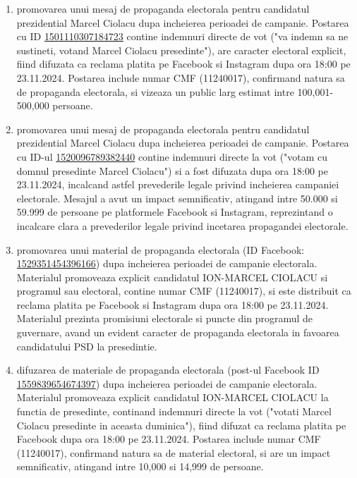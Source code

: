 \documentclass[a4paper,12pt]{article}
\begin{document}
\begin{enumerate}[leftmargin=*, label=\arabic*.)]
    \item promovarea unui mesaj de propaganda electorala pentru candidatul prezidential Marcel Ciolacu dupa incheierea perioadei de campanie. Postarea cu ID \href{https://www.facebook.com/ads/library/?id=1501110307184723}{1501110307184723} contine indemnuri directe de vot ("va indemn sa ne sustineti, votand Marcel Ciolacu presedinte"), are caracter electoral explicit, fiind difuzata ca reclama platita pe Facebook si Instagram dupa ora 18:00 pe 23.11.2024. Postarea include numar CMF (11240017), confirmand natura sa de propaganda electorala, si vizeaza un public larg estimat intre 100,001-500,000 persoane.
    \item promovarea unui mesaj de propaganda electorala pentru candidatul prezidential Marcel Ciolacu dupa incheierea perioadei de campanie. Postarea cu ID-ul \href{https://www.facebook.com/ads/library/?id=1520096789382440}{1520096789382440} contine indemnuri directe la vot ("votam cu domnul presedinte Marcel Ciolacu") si a fost difuzata dupa ora 18:00 pe 23.11.2024, incalcand astfel prevederile legale privind incheierea campaniei electorale. Mesajul a avut un impact semnificativ, atingand intre 50.000 si 59.999 de persoane pe platformele Facebook si Instagram, reprezintand o incalcare clara a prevederilor legale privind incetarea propagandei electorale.
    \item promovarea unui material de propaganda electorala (ID Facebook: \href{https://www.facebook.com/ads/library/?id=1529351454396166}{1529351454396166}) dupa incheierea perioadei de campanie electorala. Materialul promoveaza explicit candidatul ION-MARCEL CIOLACU si programul sau electoral, contine numar CMF (11240017), si este distribuit ca reclama platita pe Facebook si Instagram dupa ora 18:00 pe 23.11.2024. Materialul prezinta promisiuni electorale si puncte din programul de guvernare, avand un evident caracter de propaganda electorala in favoarea candidatului PSD la presedintie.
    \item difuzarea de materiale de propaganda electorala (post-ul Facebook ID \href{https://www.facebook.com/ads/library/?id=1559839654674397}{1559839654674397}) dupa incheierea perioadei de campanie electorala. Materialul promoveaza explicit candidatul ION-MARCEL CIOLACU la functia de presedinte, continand indemnuri directe la vot ("votati Marcel Ciolacu presedinte in aceasta duminica"), fiind difuzat ca reclama platita pe Facebook dupa ora 18:00 pe 23.11.2024. Postarea include numar CMF (11240017), confirmand natura sa de material electoral, si are un impact semnificativ, atingand intre 10,000 si 14,999 de persoane.

\end{enumerate}
\end{document}
